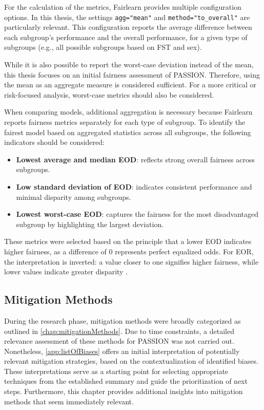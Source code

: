 \documentclass[12pt, a4paper, oneside]{book}   	%
\begin{document}
		For the calculation of the metrics, \gls{Fairlearn} provides multiple configuration options. In this thesis, the settings \texttt{agg="mean"} and \texttt{method="to\_overall"} are particularly relevant. This configuration reports the average difference between each subgroup’s performance and the overall performance, for a given type of subgroups (e.g., all possible subgroups based on \gls{FST} and sex).
		
		While it is also possible to report the worst-case deviation instead of the mean, this thesis focuses on an initial fairness assessment of PASSION. Therefore, using the mean as an aggregate measure is considered sufficient. For a more critical or risk-focused analysis, worst-case metrics should also be considered.
		
		When comparing models, additional aggregation is necessary because \gls{Fairlearn} reports fairness metrics separately for each type of subgroup. To identify the fairest model based on aggregated statistics across all subgroups, the following indicators should be considered:
		\begin{itemize}
			\item \textbf{Lowest average and median \gls{EOD}}: reflects strong overall fairness across subgroups.
			\item \textbf{Low standard deviation of \gls{EOD}}: indicates consistent performance and minimal disparity among subgroups.
			\item \textbf{Lowest worst-case \gls{EOD}}: captures the fairness for the most disadvantaged subgroup by highlighting the largest deviation.
		\end{itemize}
		These metrics were selected based on the principle that a lower \gls{EOD} indicates higher fairness, as a difference of 0 represents perfect equalized odds. For \gls{EOR}, the interpretation is inverted: a value closer to one signifies higher fairness, while lower values indicate greater disparity \autocite{Fairlearn_nodate}.
		
		
		\subsection{Mitigation Methods}
		During the research phase, mitigation methods were broadly categorized as outlined in \autoref{chap:mitigationMethods}. Due to time constraints, a detailed relevance assessment of these methods for PASSION was not carried out. Nonetheless, \autoref{app:listOfBiases} offers an initial interpretation of potentially relevant mitigation strategies, based on the contextualization of identified biases. These interpretations serve as a starting point for selecting appropriate techniques from the established summary and guide the prioritization of next steps. Furthermore, this chapter provides additional insights into mitigation methods that seem immediately relevant.
	
\end{document}
